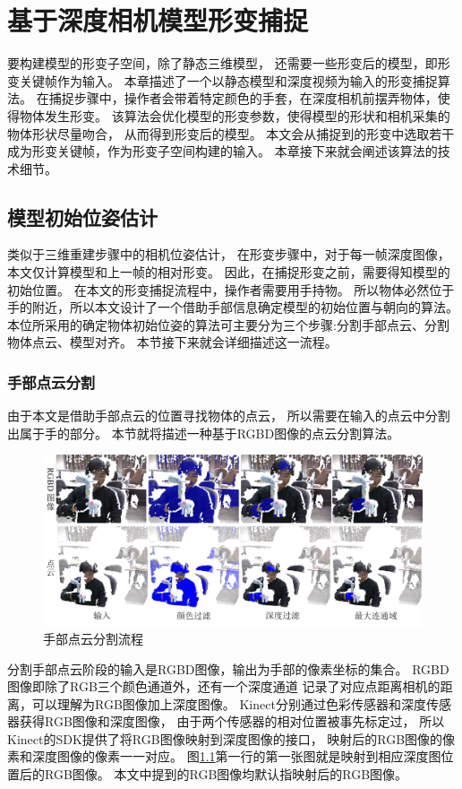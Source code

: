 \chapter{基于深度相机模型形变捕捉}
要构建模型的形变子空间，除了静态三维模型，
还需要一些形变后的模型，即形变关键帧作为输入。
本章描述了一个以静态模型和深度视频为输入的形变捕捉算法。
在捕捉步骤中，操作者会带着特定颜色的手套，在深度相机前摆弄物体，使得物体发生形变。
该算法会优化模型的形变参数，使得模型的形状和相机采集的物体形状尽量吻合，
从而得到形变后的模型。
本文会从捕捉到的形变中选取若干成为形变关键帧，作为形变子空间构建的输入。
本章接下来就会阐述该算法的技术细节。

\section{模型初始位姿估计}

 类似于三维重建步骤中的相机位姿估计，
 在形变步骤中，对于每一帧深度图像，本文仅计算模型和上一帧的相对形变。
 因此，在捕捉形变之前，需要得知模型的初始位置。
 在本文的形变捕捉流程中，操作者需要用手持物。
 所以物体必然位于手的附近，所以本文设计了一个借助手部信息确定模型的初始位置与朝向的算法。
 本位所采用的确定物体初始位姿的算法可主要分为三个步骤:分割手部点云、分割物体点云、模型对齐。
 本节接下来就会详细描述这一流程。

\subsection{手部点云分割}
由于本文是借助手部点云的位置寻找物体的点云，
所以需要在输入的点云中分割出属于手的部分。
本节就将描述一种基于RGBD图像的点云分割算法。
\begin{figure}[h]
    \centering
    \includegraphics[width = \textwidth]{./Pictures/FindingHand.png}
    \caption{手部点云分割流程}
    \label{finding_hand}
\end{figure}
分割手部点云阶段的输入是RGBD图像，输出为手部的像素坐标的集合。
RGBD图像即除了RGB三个颜色通道外，还有一个深度通道
记录了对应点距离相机的距离，可以理解为RGB图像加上深度图像。
Kinect分别通过色彩传感器和深度传感器获得RGB图像和深度图像，
由于两个传感器的相对位置被事先标定过，
所以Kinect的SDK提供了将RGB图像映射到深度图像的接口，
映射后的RGB图像的像素和深度图像的像素一一对应。
图\ref{finding_hand}第一行的第一张图就是映射到相应深度图位置后的RGB图像。
本文中提到的RGB图像均默认指映射后的RGB图像。

